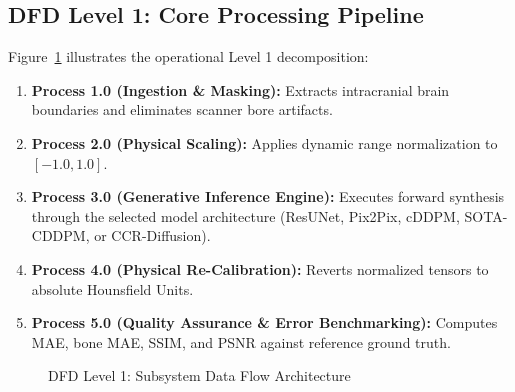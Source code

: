 \subsection{DFD Level 1: Core Processing Pipeline}
Figure~\ref{fig:dfd_1} illustrates the operational Level 1 decomposition:
\begin{enumerate}
    \item \textbf{Process 1.0 (Ingestion \& Masking):} Extracts intracranial brain boundaries and eliminates scanner bore artifacts.
    \item \textbf{Process 2.0 (Physical Scaling):} Applies dynamic range normalization to $[-1.0, 1.0]$.
    \item \textbf{Process 3.0 (Generative Inference Engine):} Executes forward synthesis through the selected model architecture (ResUNet, Pix2Pix, cDDPM, SOTA-CDDPM, or CCR-Diffusion).
    \item \textbf{Process 4.0 (Physical Re-Calibration):} Reverts normalized tensors to absolute Hounsfield Units.
    \item \textbf{Process 5.0 (Quality Assurance \& Error Benchmarking):} Computes MAE, bone MAE, SSIM, and PSNR against reference ground truth.
\end{enumerate}

\begin{figure}[htbp]
\centering
{}
\caption{DFD Level 1: Subsystem Data Flow Architecture}
\label{fig:dfd_1}
\end{figure}

